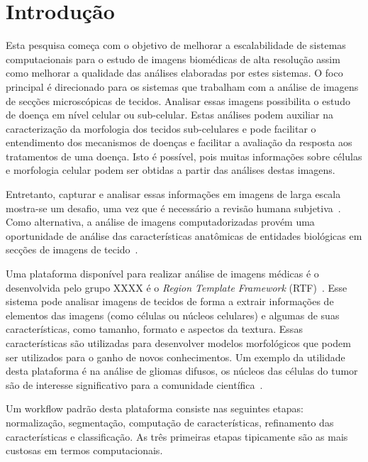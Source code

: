 \documentclass[a4paper,10pt]{article}
\begin{document}
	
	
\section{Introdução}

Esta pesquisa começa com o objetivo de melhorar a escalabilidade de sistemas computacionais para o estudo de imagens biomédicas de alta resolução assim como melhorar a qualidade das análises elaboradas por estes sistemas. O foco principal é direcionado para os sistemas que trabalham com a análise de imagens de secções microscópicas de tecidos. Analisar essas imagens possibilita o estudo de doença em nível celular ou sub-celular. Estas análises podem auxiliar na caracterização da morfologia dos tecidos sub-celulares e pode facilitar o entendimento dos mecanismos de doenças e facilitar a avaliação da resposta aos tratamentos de uma doença. Isto é possível, pois muitas informações sobre células e morfologia celular podem ser obtidas a partir das análises destas imagens.

Entretanto, capturar e analisar essas informações em imagens de larga escala mostra-se um desafio, uma vez que é necessário a revisão humana subjetiva~\cite{kong2011comprehensive}. Como alternativa, a análise de imagens computadorizadas provém uma oportunidade de análise das características anatômicas de entidades biológicas em secções de imagens de tecido~\cite{kong2010texture}.

Uma plataforma disponível para realizar análise de imagens médicas é o desenvolvida pelo grupo XXXX é o \textit{Region Template Framework} (RTF)~\cite{teodoro2014region}. Esse sistema pode analisar imagens de tecidos de forma a extrair informações de elementos das imagens (como células ou núcleos celulares) e algumas de suas características, como tamanho, formato e aspectos da textura. Essas características são utilizadas para desenvolver modelos morfológicos que podem ser utilizados para o ganho de novos conhecimentos. Um exemplo da utilidade desta plataforma é na análise de gliomas difusos, os núcleos das células do tumor são de interesse significativo para a comunidade científica~\cite{gupta2005clarifying}.

Um workflow padrão desta plataforma consiste nas seguintes etapas: normalização, segmentação, computação de características, refinamento das características e classificação. As três primeiras etapas tipicamente são as mais custosas em termos computacionais. 
\end{document}
